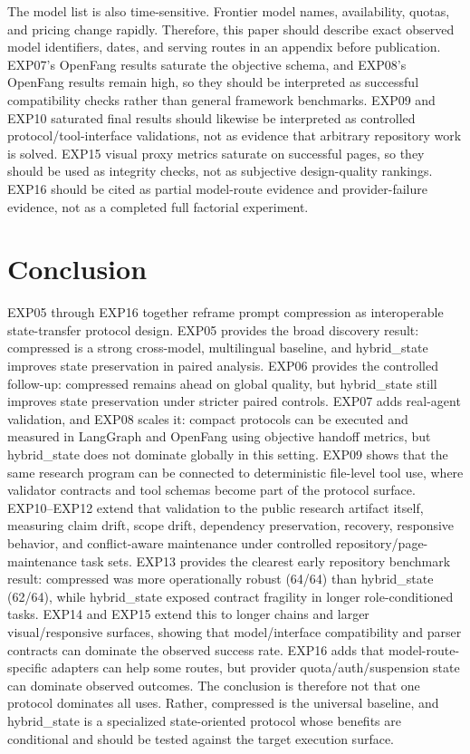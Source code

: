 \documentclass[11pt]{article}
\begin{document}
The model list is also time-sensitive. Frontier model names, availability, quotas, and pricing change rapidly. Therefore, this paper should describe exact observed model identifiers, dates, and serving routes in an appendix before publication. EXP07's OpenFang results saturate the objective schema, and EXP08's OpenFang results remain high, so they should be interpreted as successful compatibility checks rather than general framework benchmarks. EXP09 and EXP10 saturated final results should likewise be interpreted as controlled protocol/tool-interface validations, not as evidence that arbitrary repository work is solved. EXP15 visual proxy metrics saturate on successful pages, so they should be used as integrity checks, not as subjective design-quality rankings. EXP16 should be cited as partial model-route evidence and provider-failure evidence, not as a completed full factorial experiment.

\section{Conclusion}
EXP05 through EXP16 together reframe prompt compression as interoperable state-transfer protocol design. EXP05 provides the broad discovery result: compressed is a strong cross-model, multilingual baseline, and hybrid\_state improves state preservation in paired analysis. EXP06 provides the controlled follow-up: compressed remains ahead on global quality, but hybrid\_state still improves state preservation under stricter paired controls. EXP07 adds real-agent validation, and EXP08 scales it: compact protocols can be executed and measured in LangGraph and OpenFang using objective handoff metrics, but hybrid\_state does not dominate globally in this setting. EXP09 shows that the same research program can be connected to deterministic file-level tool use, where validator contracts and tool schemas become part of the protocol surface. EXP10--EXP12 extend that validation to the public research artifact itself, measuring claim drift, scope drift, dependency preservation, recovery, responsive behavior, and conflict-aware maintenance under controlled repository/page-maintenance task sets. EXP13 provides the clearest early repository benchmark result: compressed was more operationally robust (64/64) than hybrid\_state (62/64), while hybrid\_state exposed contract fragility in longer role-conditioned tasks. EXP14 and EXP15 extend this to longer chains and larger visual/responsive surfaces, showing that model/interface compatibility and parser contracts can dominate the observed success rate. EXP16 adds that model-route-specific adapters can help some routes, but provider quota/auth/suspension state can dominate observed outcomes. The conclusion is therefore not that one protocol dominates all uses. Rather, compressed is the universal baseline, and hybrid\_state is a specialized state-oriented protocol whose benefits are conditional and should be tested against the target execution surface.
\end{document}
